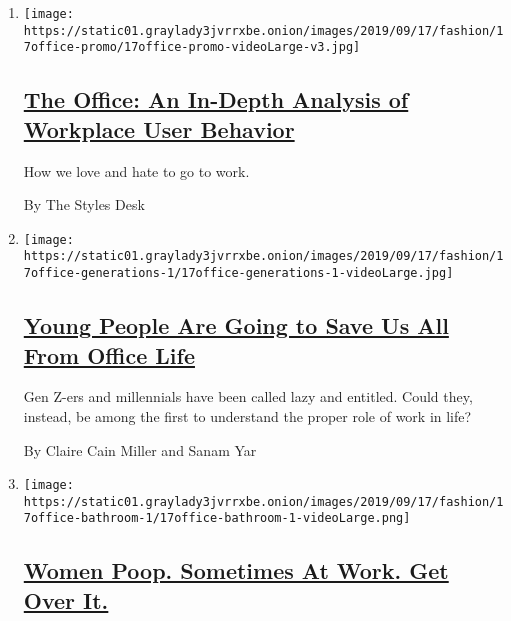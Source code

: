 \begin{enumerate}
\def\labelenumi{\arabic{enumi}.}
\item
  \texttt{[image: https://static01.graylady3jvrrxbe.onion/images/2019/09/17/fashion/17office-promo/17office-promo-videoLarge-v3.jpg]}

  \hypertarget{the-office-an-in-depth-analysis-of-workplace-user-behavior}{%
  \subsection{\texorpdfstring{\href{/interactive/2019/09/17/style/the-office.html}{The
  Office: An In-Depth Analysis of Workplace User
  Behavior}}{The Office: An In-Depth Analysis of Workplace User Behavior}}\label{the-office-an-in-depth-analysis-of-workplace-user-behavior}}

  How we love and hate to go to work.

  By The Styles Desk
\item
  \texttt{[image: https://static01.graylady3jvrrxbe.onion/images/2019/09/17/fashion/17office-generations-1/17office-generations-1-videoLarge.jpg]}

  \hypertarget{young-people-are-going-to-save-us-all-from-office-life}{%
  \subsection{\texorpdfstring{\href{/2019/09/17/style/generation-z-millennials-work-life-balance.html}{Young
  People Are Going to Save Us All From Office
  Life}}{Young People Are Going to Save Us All From Office Life}}\label{young-people-are-going-to-save-us-all-from-office-life}}

  Gen Z-ers and millennials have been called lazy and entitled. Could
  they, instead, be among the first to understand the proper role of
  work in life?

  By Claire Cain Miller and Sanam Yar
\item
  \texttt{[image: https://static01.graylady3jvrrxbe.onion/images/2019/09/17/fashion/17office-bathroom-1/17office-bathroom-1-videoLarge.png]}

  \hypertarget{women-poop-sometimes-at-work-get-over-it}{%
  \subsection{\texorpdfstring{\href{/2019/09/17/style/women-poop-at-work.html}{Women
  Poop. Sometimes At Work. Get Over
  It.}}{Women Poop. Sometimes At Work. Get Over It.}}\label{women-poop-sometimes-at-work-get-over-it}}


\end{enumerate}
